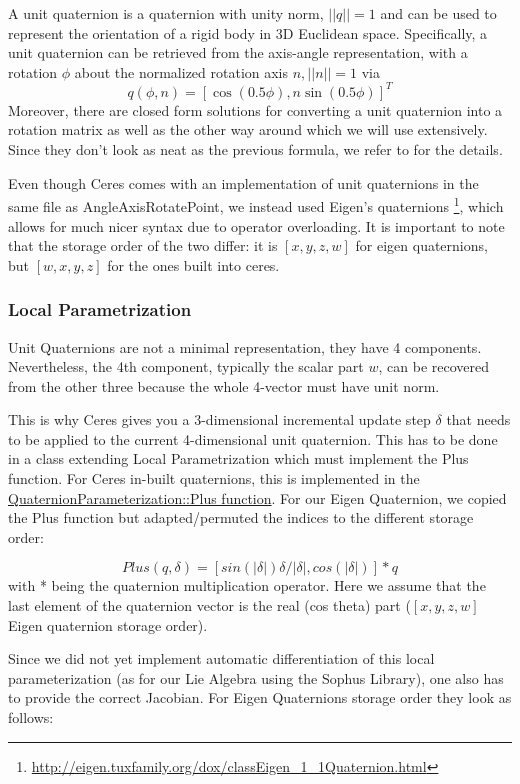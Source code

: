 \documentclass[12pt, a4paper]{article}
\begin{document}
A unit quaternion is a quaternion with unity norm, $||q||=1$ and can be used to represent the orientation of a rigid body in 3D Euclidean space. Specifically, a unit quaternion can be retrieved from the axis-angle representation, with a rotation $\phi$ about the normalized rotation axis $n, ||n||=1$ via
\[
q(\phi,n)=[\cos(0.5 \phi) , n \sin(0.5 \phi)]^T
\]
Moreover, there are closed form solutions for converting a unit quaternion into a rotation matrix as well as the other way around which we will use extensively. Since they don't look as neat as the previous formula, we refer to \cite{diebel2006representing} for the details.

Even though Ceres comes with an implementation of unit quaternions in the same file as AngleAxisRotatePoint, we instead used Eigen's quaternions \footnote{\url{http://eigen.tuxfamily.org/dox/classEigen_1_1Quaternion.html}}, which allows for much nicer syntax due to operator overloading. It is important to note that the storage order of the two differ: it is  $[x, y, z, w]$ for eigen quaternions, but  $[w, x, y, z]$ for the ones built into ceres.

\subsubsection{Local Parametrization}
Unit Quaternions are not a minimal representation, they have 4 components. Nevertheless, the 4th component, typically the scalar part $w$, can be recovered from the other three because the whole 4-vector must have unit norm.

This is why Ceres gives you a 3-dimensional incremental update step $\delta$ that needs to be applied to the current 4-dimensional unit quaternion. This has to be done in a class extending Local Parametrization which must implement the Plus function. For Ceres in-built quaternions, this is implemented in the \href{https://github.com/ceres-solver/ceres-solver/blob/master/internal/ceres/local_parameterization.cc#L157}{QuaternionParameterization::Plus function}. For our Eigen Quaternion, we copied the Plus function but adapted/permuted the indices to the different storage order:

\[
Plus(q, \delta) = [sin(|\delta|) \delta / |\delta|, cos(|\delta|)] * q
\]
with * being the quaternion multiplication operator. Here we assume that the last element of the quaternion vector is the real (cos theta) part ($[x, y, z, w]$ Eigen quaternion storage order).

Since we did not yet implement automatic differentiation of this local parameterization (as for our Lie Algebra using the Sophus Library), one also has to provide the correct Jacobian. For Eigen Quaternions storage order they look as follows:
\end{document}
